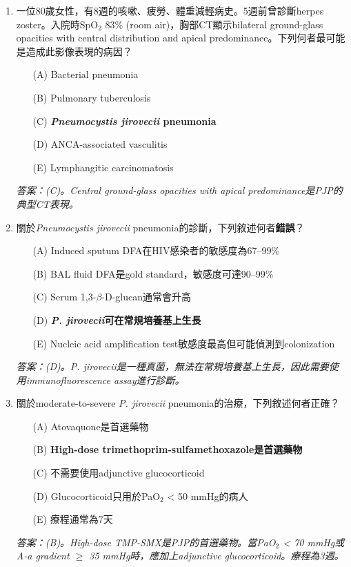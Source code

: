 \documentclass[12pt,a4paper]{article}
\begin{document}
\begin{enumerate}
    \item 一位80歲女性，有8週的咳嗽、疲勞、體重減輕病史。5週前曾診斷herpes zoster。入院時SpO$_2$ 83\% (room air)，胸部CT顯示bilateral ground-glass opacities with central distribution and apical predominance。下列何者最可能是造成此影像表現的病因？
    \begin{enumerate}
        \item[(A)] Bacterial pneumonia
        \item[(B)] Pulmonary tuberculosis
        \item[(C)] \textbf{\textit{Pneumocystis jirovecii} pneumonia}
        \item[(D)] ANCA-associated vasculitis
        \item[(E)] Lymphangitic carcinomatosis
    \end{enumerate}
    \textit{答案：(C)。Central ground-glass opacities with apical predominance是PJP的典型CT表現。}

    \vspace{0.5cm}

    \item 關於\textit{Pneumocystis jirovecii} pneumonia的診斷，下列敘述何者\textbf{錯誤}？
    \begin{enumerate}
        \item[(A)] Induced sputum DFA在HIV感染者的敏感度為67--99\%
        \item[(B)] BAL fluid DFA是gold standard，敏感度可達90--99\%
        \item[(C)] Serum 1,3-$\beta$-D-glucan通常會升高
        \item[(D)] \textbf{\textit{P. jirovecii}可在常規培養基上生長}
        \item[(E)] Nucleic acid amplification test敏感度最高但可能偵測到colonization
    \end{enumerate}
    \textit{答案：(D)。\textit{P. jirovecii}是一種真菌，無法在常規培養基上生長，因此需要使用immunofluorescence assay進行診斷。}

    \vspace{0.5cm}

    \item 關於moderate-to-severe \textit{P. jirovecii} pneumonia的治療，下列敘述何者正確？
    \begin{enumerate}
        \item[(A)] Atovaquone是首選藥物
        \item[(B)] \textbf{High-dose trimethoprim-sulfamethoxazole是首選藥物}
        \item[(C)] 不需要使用adjunctive glucocorticoid
        \item[(D)] Glucocorticoid只用於PaO$_2$ < 50 mmHg的病人
        \item[(E)] 療程通常為7天
    \end{enumerate}
    \textit{答案：(B)。High-dose TMP-SMX是PJP的首選藥物。當PaO$_2$ < 70 mmHg或A-a gradient $\geq$ 35 mmHg時，應加上adjunctive glucocorticoid。療程為3週。}


\end{enumerate}
\end{document}
